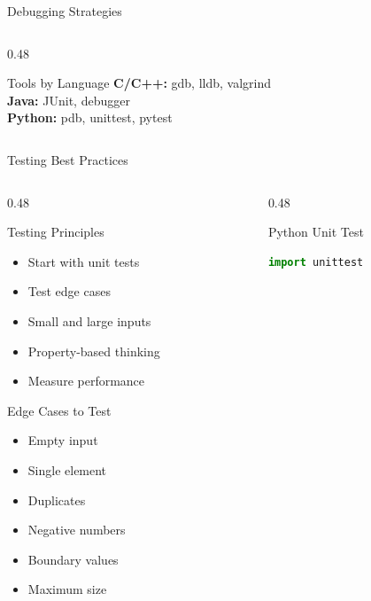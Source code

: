 \documentclass[aspectratio=169,xcolor=dvipsnames]{beamer}
\begin{document}
\begin{frame}{Debugging Strategies}
\begin{columns}
\begin{column}{0.48\textwidth}
      \vspace{0.2cm}

      \begin{exampleblock}{Tools by Language}
        \textbf{C/C++:} gdb, lldb, valgrind \\
        \textbf{Java:} JUnit, debugger \\
        \textbf{Python:} pdb, unittest, pytest
      \end{exampleblock}
    \end{column}
  \end{columns}
\end{frame}

\begin{frame}[fragile]{Testing Best Practices}
  \begin{columns}
    \begin{column}{0.48\textwidth}
      \begin{block}{Testing Principles}
        \begin{itemize}
          \item Start with unit tests
          \item Test edge cases
          \item Small and large inputs
          \item Property-based thinking
          \item Measure performance
        \end{itemize}
      \end{block}

      \vspace{0.2cm}

      \begin{exampleblock}{Edge Cases to Test}
        \begin{itemize}
          \item Empty input
          \item Single element
          \item Duplicates
          \item Negative numbers
          \item Boundary values
          \item Maximum size
        \end{itemize}
      \end{exampleblock}
    \end{column}
    \begin{column}{0.48\textwidth}
      \begin{exampleblock}{Python Unit Test}
        \begin{lstlisting}[language=Python,basicstyle=\tiny\ttfamily]
import unittest


\end{lstlisting}
\end{exampleblock}
\end{column}
\end{columns}
\end{frame}
\end{document}
